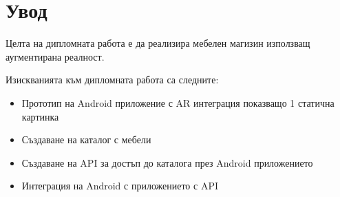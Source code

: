 \chapter*{Увод}
Целта на дипломната работа е да реализира мебелен магизин използващ аугментирана реалност.

Изискванията към дипломната работа са следните:

\begin{itemize}
    \item Прототип на Android приложение с AR интеграция показващо 1 статична картинка
    \item Създаване на каталог с мебели

    \item Създаване на API за достъп до каталога през Android приложението

    \item Интеграция на Android с приложението с API
\end{itemize}